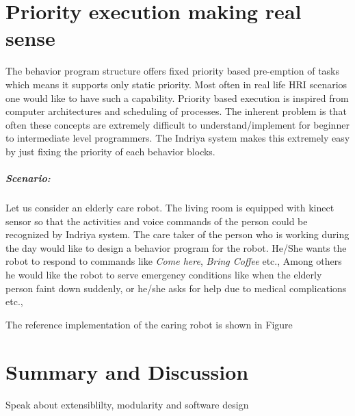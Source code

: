 \section{Priority execution making real sense}
The behavior program structure offers fixed priority based pre-emption of tasks which means it supports only static priority. Most often in real life HRI scenarios one would like to have such a capability. Priority based execution is inspired from computer architectures and scheduling of processes. The inherent problem is that often these concepts are extremely difficult to understand/implement for beginner to intermediate level programmers. The Indriya system makes this extremely easy by just fixing the priority of each behavior blocks.  

\subparagraph{Scenario:}Let us consider an elderly care robot. The living room is equipped with kinect sensor so that the activities and voice commands of the person could be recognized by Indriya system. The care taker of the person who is working during the day would like to design a behavior program for the robot. He/She wants the robot to respond to commands like \emph{Come here}, \emph{Bring Coffee} etc., Among others he would like the robot to serve emergency conditions like when the elderly person faint down suddenly, or he/she asks for help due to medical complications etc.,

The reference implementation of the caring robot is shown in Figure~

\section{Summary and Discussion}

Speak about extensiblilty, modularity and software design